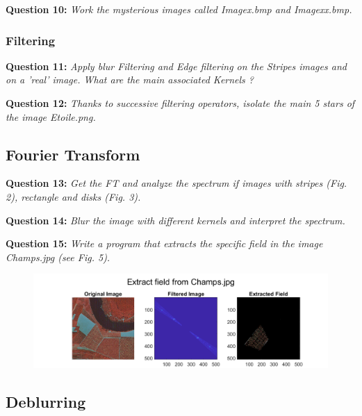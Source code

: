 


\textbf{Question 10:}
\textit{Work the mysterious images called Imagex.bmp and Imagexx.bmp.}






\subsubsection{Filtering}
\textbf{Question 11:}
\textit{Apply blur Filtering and Edge ﬁltering on the Stripes images and on a ’real’ image. What are the main associated Kernels ?}



\textbf{Question 12:}
\textit{Thanks to successive ﬁltering operators, isolate the main 5 stars of the image Etoile.png.}


\subsection{Fourier Transform}
\textbf{Question 13:}
\textit{Get the FT and analyze the spectrum if images with stripes (Fig. 2), rectangle and disks (Fig. 3).}



\textbf{Question 14:}
\textit{Blur the image with diﬀerent kernels and interpret the spectrum.}



\textbf{Question 15:}
\textit{Write a program that extracts the speciﬁc ﬁeld in the image Champs.jpg (see Fig. 5).}
\begin{figure}[H]
    \centering
    \includegraphics[width=\linewidth]{Doc/Graphics/Part1_Question15.png}
    \label{fig:enter-label}
\end{figure}


\subsection{Deblurring}
